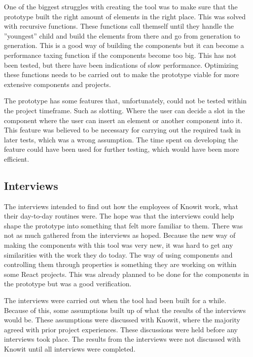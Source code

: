 One of the biggest struggles with creating the tool was to make sure that the prototype built the right amount of elements in the right place. This was solved with recursive functions. These functions call themself until they handle the ''youngest'' child and build the elements from there and go from generation to generation. This is a good way of building the components but it can become a performance taxing function if the components become too big. This has not been tested, but there have been indications of slow performance. Optimizing these functions needs to be carried out to make the prototype viable for more extensive components and projects.

The prototype has some features that, unfortunately, could not be tested within the project timeframe. Such as slotting. Where the user can decide a slot in the component where the user can insert an element or another component into it. This feature was believed to be necessary for carrying out the required task in later tests, which was a wrong assumption. The time spent on developing the feature could have been used for further testing, which would have been more efficient.



\subsection{Interviews}%
\label{sub:Interviews}

The interviews intended to find out how the employees of Knowit work, what their day-to-day routines were. The hope was that the interviews could help shape the prototype into something that felt more familiar to them. There was not as much gathered from the interviews as hoped. Because the new way of making the components with this tool was very new, it was hard to get any similarities with the work they do today. The way of using components and controlling them through properties is something they are working on within some React projects. This was already planned to be done for the components in the prototype but was a good verification. 

The interviews were carried out when the tool had been built for a while. Because of this, some assumptions built up of what the results of the interviews would be. These assumptions were discussed with Knowit, where the majority agreed with prior project experiences. These discussions were held before any interviews took place. The results from the interviews were not discussed with Knowit until all interviews were completed. 

